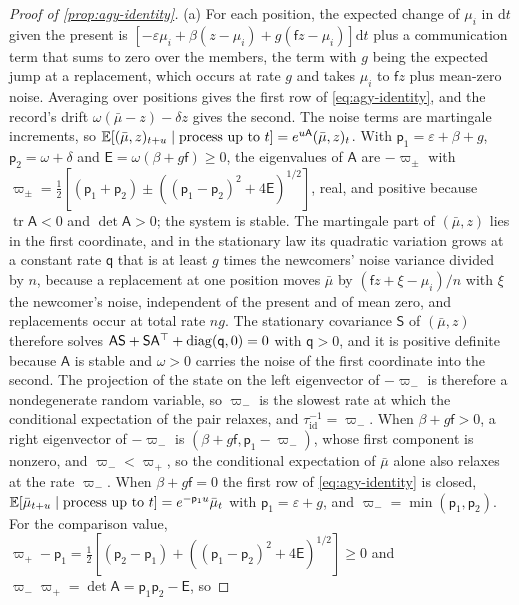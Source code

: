 \begin{proof}[Proof of \cref{prop:agy-identity}]
(a) For each position, the expected change of $\mu_i$ in $\mathrm dt$ given the present is $[-\varepsilon\mu_i+\beta(z-\mu_i)+g(\mathsf fz-\mu_i)]\mathrm dt$ plus a communication term that sums to zero over the members, the term with $g$ being the expected jump at a replacement, which occurs at rate $g$ and takes $\mu_i$ to $\mathsf fz$ plus mean-zero noise. Averaging over positions gives the first row of \eqref{eq:agy-identity}, and the record's drift $\omega(\bar\mu-z)-\delta z$ gives the second. The noise terms are martingale increments, so $\mathbb{E}[(\bar\mu,z)_{t+u}\mid\text{process up to }t]=e^{u\mathsf A}(\bar\mu,z)_t$. With $\mathsf p_1=\varepsilon+\beta+g$, $\mathsf p_2=\omega+\delta$ and $\mathsf E=\omega(\beta+g\mathsf f)\ge0$, the eigenvalues of $\mathsf A$ are $-\varpi_\pm$ with $\varpi_\pm=\frac12[(\mathsf p_1+\mathsf p_2)\pm((\mathsf p_1-\mathsf p_2)^2+4\mathsf E)^{1/2}]$, real, and positive because $\operatorname{tr}\mathsf A<0$ and $\det\mathsf A>0$; the system is stable. The martingale part of $(\bar\mu,z)$ lies in the first coordinate, and in the stationary law its quadratic variation grows at a constant rate $\mathsf q$ that is at least $g$ times the newcomers' noise variance divided by $n$, because a replacement at one position moves $\bar\mu$ by $(\mathsf fz+\xi-\mu_i)/n$ with $\xi$ the newcomer's noise, independent of the present and of mean zero, and replacements occur at total rate $ng$. The stationary covariance $\mathsf S$ of $(\bar\mu,z)$ therefore solves $\mathsf A\mathsf S+\mathsf S\mathsf A^\top+\operatorname{diag}(\mathsf q,0)=0$ with $\mathsf q>0$, and it is positive definite because $\mathsf A$ is stable and $\omega>0$ carries the noise of the first coordinate into the second. The projection of the state on the left eigenvector of $-\varpi_-$ is therefore a nondegenerate random variable, so $\varpi_-$ is the slowest rate at which the conditional expectation of the pair relaxes, and $\tau_{\mathrm{id}}^{-1}=\varpi_-$. When $\beta+g\mathsf f>0$, a right eigenvector of $-\varpi_-$ is $(\beta+g\mathsf f,\mathsf p_1-\varpi_-)$, whose first component is nonzero, and $\varpi_-<\varpi_+$, so the conditional expectation of $\bar\mu$ alone also relaxes at the rate $\varpi_-$. When $\beta+g\mathsf f=0$ the first row of \eqref{eq:agy-identity} is closed, $\mathbb{E}[\bar\mu_{t+u}\mid\text{process up to }t]=e^{-\mathsf p_1u}\bar\mu_t$ with $\mathsf p_1=\varepsilon+g$, and $\varpi_-=\min(\mathsf p_1,\mathsf p_2)$. For the comparison value, $\varpi_+-\mathsf p_1=\frac12[(\mathsf p_2-\mathsf p_1)+((\mathsf p_1-\mathsf p_2)^2+4\mathsf E)^{1/2}]\ge0$ and $\varpi_-\varpi_+=\det\mathsf A=\mathsf p_1\mathsf p_2-\mathsf E$, so

\end{proof}
